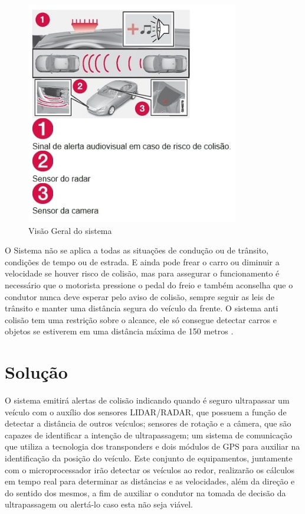 \begin{figure}[h!]
  \centering
  \includegraphics[width=350px, scale=0.5]{figuras/visao_geral}
  \caption{Visão Geral do sistema}
\label{fig:visao_geral}
\end{figure}

O Sistema não se aplica a todas as situações de condução ou de trânsito, condições de tempo ou de estrada. E ainda pode frear o carro ou diminuir a velocidade se houver risco de colisão, mas para assegurar o funcionamento é necessário que o motorista pressione o pedal do freio e também aconselha que o condutor nunca deve esperar pelo aviso de colisão, sempre seguir as leis de trânsito e manter uma distância segura do veículo da frente. 
O sistema anti colisão tem uma restrição sobre o alcance, ele só consegue detectar carros e objetos se estiverem em uma distância máxima de 150 metros \cite{volvo_system}. 

\section{Solução}

O sistema emitirá alertas de colisão indicando quando é seguro ultrapassar um veículo com o auxílio dos sensores LIDAR/RADAR, que possuem a função de detectar a distância de outros veículos; sensores de rotação e a câmera, que são capazes de identificar a intenção de ultrapassagem; um sistema de comunicação que utiliza a tecnologia dos transponders e dois módulos de GPS para auxiliar na identificação da posição do veículo. Este conjunto de equipamentos, juntamente com o microprocessador irão detectar os veículos ao redor, realizarão os cálculos em tempo real para determinar as distâncias e as velocidades, além da direção e do sentido dos mesmos, a fim de auxiliar o condutor na tomada de decisão da ultrapassagem ou alertá-lo caso esta não seja viável.

